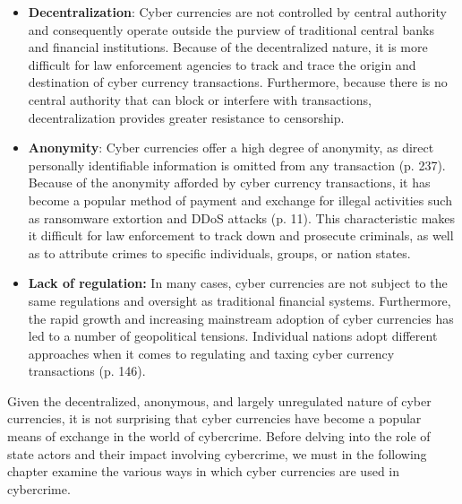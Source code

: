 \begin{itemize}
    \item \textbf{Decentralization}: Cyber currencies are not controlled by central authority and consequently operate outside the purview of traditional central banks and financial institutions. Because of the decentralized nature, it is more difficult for law enforcement agencies to track and trace the origin and destination of cyber currency transactions. Furthermore, because there is no central authority that can block or interfere with transactions, decentralization provides greater resistance to censorship.
    \item \textbf{Anonymity}: Cyber currencies offer a high degree of anonymity, as direct personally identifiable information is omitted from any transaction \cite{ober_structure_2013} (p. 237). Because of the anonymity afforded by cyber currency transactions, it has become a popular method of payment and exchange for illegal activities such as ransomware extortion and DDoS attacks \cite{noauthor_internet_nodate} (p. 11). This characteristic makes it difficult for law enforcement to track down and prosecute criminals, as well as to attribute crimes to specific individuals, groups, or nation states.
    \item \textbf{Lack of regulation:} In many cases, cyber currencies are not subject to the same regulations and oversight as traditional financial systems. Furthermore, the rapid growth and increasing mainstream adoption of cyber currencies has led to a number of geopolitical tensions. Individual nations adopt different approaches when it comes to regulating and taxing cyber currency transactions \cite{law_at_sogang_university_school_of_law_jd_pittsburgh_current_2021} (p. 146).
\end{itemize}

Given the decentralized, anonymous, and largely unregulated nature of cyber currencies, it is not surprising that cyber currencies have become a popular means of exchange in the world of cybercrime. Before delving into the role of state actors and their impact involving cybercrime, we must in the following chapter examine the various ways in which cyber currencies are used in cybercrime.